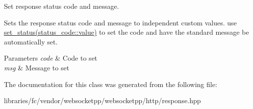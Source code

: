 Set response status code and message. 

Sets the response status code and message to independent custom values. use \mbox{\hyperlink{classwebsocketpp_1_1http_1_1parser_1_1response_a2576fc301cc6798d5a830298188b4832}{set\+\_\+status(status\+\_\+code\+::value)}} to set the code and have the standard message be automatically set.


\begin{DoxyParams}{Parameters}
{\em code} & Code to set \\
\hline
{\em msg} & Message to set \\
\hline
\end{DoxyParams}


The documentation for this class was generated from the following file\+:\begin{DoxyCompactItemize}
\item 
libraries/fc/vendor/websocketpp/websocketpp/http/response.\+hpp\end{DoxyCompactItemize}
